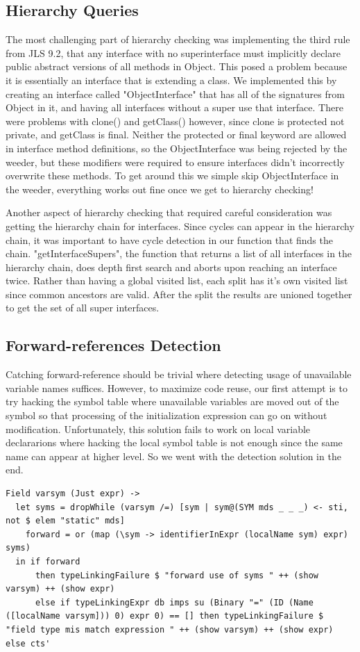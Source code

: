 \documentclass[12pt,letterpaper]{article}
\begin{document}
\subsection{Hierarchy Queries}
The most challenging part of hierarchy checking was implementing the third rule from JLS 9.2, that any interface with no superinterface must implicitly declare public abstract versions of all methods in Object.
This posed a problem because it is essentially an interface that is extending a class.
We implemented this by creating an interface called "ObjectInterface" that has all of the signatures from Object in it, and having all interfaces without a super use that interface.
There were problems with clone() and getClass() however, since clone is protected not private, and getClass is final.
Neither the protected or final keyword are allowed in interface method definitions, so the ObjectInterface was being rejected by the weeder, but these modifiers were required to ensure interfaces didn't incorrectly overwrite these methods.
To get around this we simple skip ObjectInterface in the weeder, everything works out fine once we get to hierarchy checking!

Another aspect of hierarchy checking that required careful consideration was getting the hierarchy chain for interfaces.
Since cycles can appear in the hierarchy chain, it was important to have cycle detection in our function that finds the chain.
"getInterfaceSupers", the function that returns a list of all interfaces in the hierarchy chain, does depth first search and aborts upon reaching an interface twice.
Rather than having a global visited list, each split has it's own visited list since common ancestors are valid.
After the split the results are unioned together to get the set of all super interfaces.

\subsection{Forward-references Detection}
Catching forward-reference should be trivial where detecting usage of unavailable variable names suffices. However, to maximize code reuse, our first attempt is to try hacking the symbol table where unavailable variables are moved out of the symbol so that processing of the initialization expression can go on without modification. Unfortunately, this solution fails to work on local variable declararions where hacking the local symbol table is not enough since the same name can appear at higher level. So we went with the detection solution in the end.
\begin{lstlisting}
Field varsym (Just expr) ->
  let syms = dropWhile (varsym /=) [sym | sym@(SYM mds _ _ _) <- sti, not $ elem "static" mds]
    forward = or (map (\sym -> identifierInExpr (localName sym) expr) syms)
  in if forward
      then typeLinkingFailure $ "forward use of syms " ++ (show varsym) ++ (show expr)
      else if typeLinkingExpr db imps su (Binary "=" (ID (Name ([localName varsym])) 0) expr 0) == [] then typeLinkingFailure $ "field type mis match expression " ++ (show varsym) ++ (show expr) else cts'
\end{lstlisting}
\end{document}
